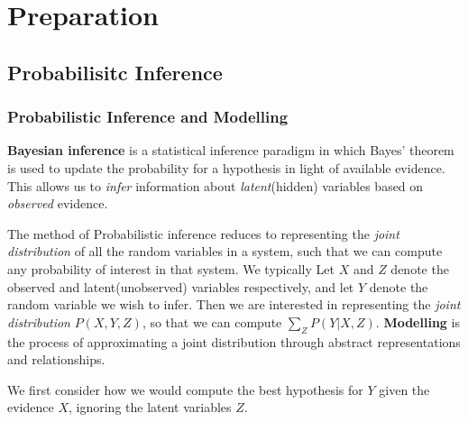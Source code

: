 \documentclass[12pt,a4paper,twoside,openright]{report}
\theoremstyle{definition}
\begin{document}
\chapter{Preparation}

\section{Probabilisitc Inference}
\subsection{Probabilistic Inference and Modelling}

\textbf{Bayesian inference} is a statistical inference paradigm in which Bayes' theorem is used to update the probability for a hypothesis in light of available evidence. This allows us to \textit{infer} information about \textit{latent}(hidden) variables based on \textit{observed} evidence.

The method of Probabilistic inference reduces to representing the \textit{joint distribution} of all the random variables in a system, such that we can compute any probability of interest in that system.
We typically 
Let $X$ and $Z$ denote the observed and latent(unobserved) variables respectively, and let $Y$ denote the random variable we wish to infer. 
Then we are interested in representing the \textit{joint distribution} $P(X,Y,Z)$, so that we can compute $\sum_Z P(Y|X,Z)$. \textbf{Modelling} is the process of approximating a joint distribution through abstract representations and relationships.

We first consider how we would compute the best hypothesis for $Y$ given the evidence $X$, ignoring the latent variables $Z$.
\end{document}
